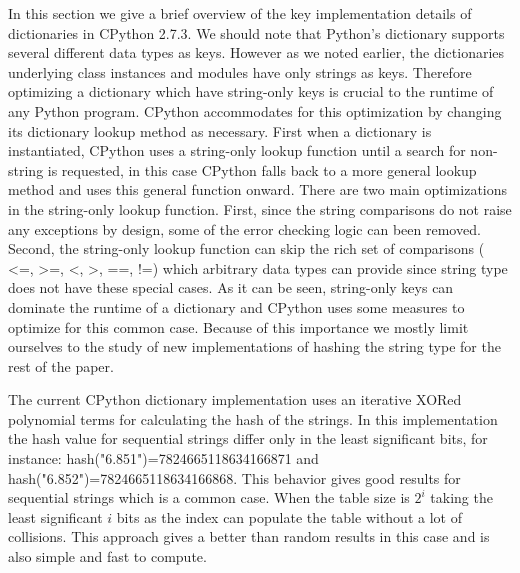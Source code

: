 \documentclass[11pt]{article}
\begin{document}
In this section we give a brief overview of the key implementation details of dictionaries in CPython 2.7.3.
We should note that Python’s dictionary supports several different data types as keys. However as we noted earlier, the dictionaries underlying class instances and modules have only strings as keys. Therefore optimizing a dictionary which have string-only keys is crucial to the runtime of any Python program. CPython accommodates for this optimization by changing its dictionary lookup method as necessary. First when a dictionary is instantiated, CPython uses a string-only lookup function until a search for non-string is requested, in this case CPython falls back to a more general lookup method and uses this general function onward. There are two main optimizations in the string-only lookup function. First, since the string comparisons do not raise any exceptions by design, some of the error checking logic can been removed. Second, the string-only lookup function can skip the rich set of comparisons ( <=, >=, <, >, ==, !=) which arbitrary data types can provide since string type does not have these special cases.  As it can be seen, string-only keys can dominate the runtime of a dictionary and CPython uses some measures to optimize for this common case. Because of this importance we mostly limit ourselves to the study of new implementations of hashing the string type for the rest of the paper.




The current CPython dictionary implementation uses an iterative XORed polynomial terms for calculating the hash of the strings. In this implementation the hash value for sequential strings differ only in the least significant bits, for instance: hash("6.851")=7824665118634166871 and hash("6.852")=7824665118634166868. This behavior gives good results for sequential strings which is a common case. When the table size is $2^i$ taking the least significant $i$ bits as the index can populate the table without a lot of collisions. This approach gives a better than random results in this case and is also simple and fast to compute.
\end{document}
